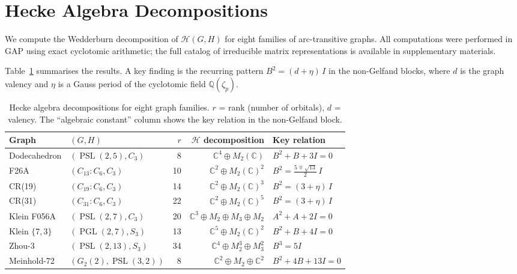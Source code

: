 \documentclass[mlmain]{jmlr}
\newcommand{\PSL}{\operatorname{PSL}}
\newcommand{\PGL}{\operatorname{PGL}}
\newcommand{\HH}{\mathcal{H}}
\newcommand{\CC}{\mathbb{C}}
\newcommand{\Q}{\mathbb{Q}}
\begin{document}
\section{Hecke Algebra Decompositions}
\label{sec:hecke}

We compute the Wedderburn decomposition of $\HH(G,H)$ for
eight families of arc-transitive graphs.  All computations
were performed in GAP using exact cyclotomic arithmetic; the
full catalog of irreducible matrix representations is
available in supplementary materials.

Table~\ref{tab:hecke} summarises the results.  A key finding
is the recurring pattern $B^2 = (d + \eta)\,I$ in the
non-Gelfand blocks, where $d$ is the graph valency and
$\eta$ is a Gauss period of the cyclotomic field
$\Q(\zeta_p)$.

\begin{table}[t]
\caption{Hecke algebra decompositions for eight graph families.
$r$ = rank (number of orbitals), $d$ = valency.  The
``algebraic constant'' column shows the key relation in the
non-Gelfand block.}
\label{tab:hecke}
\centering
\small
\begin{tabular}{@{}llrrl@{}}
\toprule
Graph & $(G, H)$ & $r$ & $\HH$ decomposition & Key relation \\
\midrule
Dodecahedron & $(\PSL(2,5), C_3)$ & 8 &
  $\CC^4 \oplus M_2(\CC)$ & $B^2 + B + 3I = 0$ \\
F26A & $(C_{13}{:}C_6, C_3)$ & 10 &
  $\CC^2 \oplus M_2(\CC)^2$ & $B^2 = \tfrac{5 \mp \sqrt{13}}{2}\,I$ \\
CR(19) & $(C_{19}{:}C_6, C_3)$ & 14 &
  $\CC^2 \oplus M_2(\CC)^3$ & $B^2 = (3+\eta)\,I$ \\
CR(31) & $(C_{31}{:}C_6, C_3)$ & 22 &
  $\CC^2 \oplus M_2(\CC)^5$ & $B^2 = (3+\eta)\,I$ \\
Klein F056A & $(\PSL(2,7), C_3)$ & 20 &
  $\CC^3 \oplus M_2 \oplus M_3 \oplus M_2$ & $A^2+A+2I=0$ \\
Klein $\{7,3\}$ & $(\PGL(2,7), S_3)$ & 13 &
  $\CC^5 \oplus M_2(\CC)^2$ & $B^2+B+4I=0$ \\
Zhou-3 & $(\PSL(2,13), S_3)$ & 34 &
  $\CC^4 \oplus M_2^3 \oplus M_3^2$ & $B^3 = 5I$ \\
Meinhold-72 & $(G_2(2), \PSL(3,2))$ & 8 &
  $\CC^2 \oplus M_2 \oplus \CC^2$ & $B^2 + 4B + 13I = 0$ \\
\bottomrule
\end{tabular}
\end{table}
\end{document}
